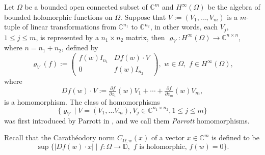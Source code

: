 \documentclass[a4paper,oneside,11pt, reqno]{amsart}
\numberwithin{equation}{section}
\theoremstyle{plain}
\begin{document}
Let $\Omega$ be a bounded open connected subset of $\mathbb{C}^m$ and $H^\infty(\Omega)$ be the algebra of bounded holomorphic functions on $\Omega$. Suppose that $V:=(V_1, \ldots , V_m)$ is a $m$-tuple of linear transformations from $\mathbb{C}^{n_1}$ to $\mathbb{C}^{n_2}$, in other words, each $V_j$, $1\leq j \leq m$, is represented by a $n_1 \times n_2$ matrix, then $\varrho_V: H^\infty(\Omega) \to \mathbb{C}^{n \times n}$, where $n=n_1+n_2$, defined by 
\[\varrho_V(f):= \begin{pmatrix} f(w) I_{n_1} & Df(w) \cdot V \\ 0 & f(w) I_{n_2}\end{pmatrix},\,\,w\in \Omega,\,\, f\in H^\infty(\Omega), \]
where \[Df(w) \cdot V := \tfrac{\partial f}{\partial z_1}(w) V_1+ \cdots + \tfrac{\partial f}{\partial z_m}(w) V_m,\] 
is a homomorphism. The class of homomorphisms  
\[\{\varrho_V\mid V=(V_1, \ldots V_m), V_j\in \mathbb{C}^{n_1\times n_2}, 1\leq j \leq m\} \] was first introduced by Parrott in \cite{SKP}, and we call them \textit{Parrott} homomorphisms. %


Recall that the Carath\'{e}odory norm $C_{\Omega,w}(x)$ of a vector $x\in \mathbb{C}^m$ is defined to be   
\[\sup\{| Df(w)\cdot x| \mid f:\Omega \to \mathbb{D},\,\, f \text{ is holomorphic, }f(w)=0\}.\] 
\end{document}
